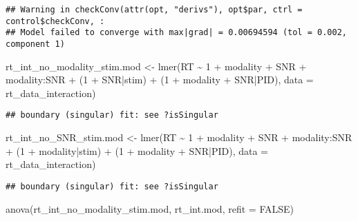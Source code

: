 \documentclass[
]{article}
\newenvironment{Shaded}{\begin{snugshade}}{\end{snugshade}}
\newcommand{\AttributeTok}[1]{\textcolor[rgb]{0.77,0.63,0.00}{#1}}
\newcommand{\ConstantTok}[1]{\textcolor[rgb]{0.00,0.00,0.00}{#1}}
\newcommand{\DecValTok}[1]{\textcolor[rgb]{0.00,0.00,0.81}{#1}}
\newcommand{\FunctionTok}[1]{\textcolor[rgb]{0.00,0.00,0.00}{#1}}
\newcommand{\NormalTok}[1]{#1}
\newcommand{\OtherTok}[1]{\textcolor[rgb]{0.56,0.35,0.01}{#1}}
\newcommand{\SpecialCharTok}[1]{\textcolor[rgb]{0.00,0.00,0.00}{#1}}
\begin{document}
\begin{verbatim}
## Warning in checkConv(attr(opt, "derivs"), opt$par, ctrl = control$checkConv, :
## Model failed to converge with max|grad| = 0.00694594 (tol = 0.002, component 1)
\end{verbatim}

\begin{Shaded}
\begin{Highlighting}[]
\NormalTok{rt\_int\_no\_modality\_stim.mod }\OtherTok{\textless{}{-}} \FunctionTok{lmer}\NormalTok{(RT }\SpecialCharTok{\textasciitilde{}} \DecValTok{1} \SpecialCharTok{+}\NormalTok{ modality }\SpecialCharTok{+}\NormalTok{ SNR }\SpecialCharTok{+}\NormalTok{ modality}\SpecialCharTok{:}\NormalTok{SNR }\SpecialCharTok{+}
\NormalTok{                     (}\DecValTok{1} \SpecialCharTok{+}\NormalTok{ SNR}\SpecialCharTok{|}\NormalTok{stim) }\SpecialCharTok{+}\NormalTok{ (}\DecValTok{1} \SpecialCharTok{+}\NormalTok{ modality }\SpecialCharTok{+}\NormalTok{ SNR}\SpecialCharTok{|}\NormalTok{PID), }
                   \AttributeTok{data =}\NormalTok{ rt\_data\_interaction)}
\end{Highlighting}
\end{Shaded}

\begin{verbatim}
## boundary (singular) fit: see ?isSingular
\end{verbatim}

\begin{Shaded}
\begin{Highlighting}[]
\NormalTok{rt\_int\_no\_SNR\_stim.mod }\OtherTok{\textless{}{-}} \FunctionTok{lmer}\NormalTok{(RT }\SpecialCharTok{\textasciitilde{}} \DecValTok{1} \SpecialCharTok{+}\NormalTok{ modality }\SpecialCharTok{+}\NormalTok{ SNR }\SpecialCharTok{+}\NormalTok{ modality}\SpecialCharTok{:}\NormalTok{SNR }\SpecialCharTok{+}
\NormalTok{                     (}\DecValTok{1} \SpecialCharTok{+}\NormalTok{ modality}\SpecialCharTok{|}\NormalTok{stim) }\SpecialCharTok{+}\NormalTok{ (}\DecValTok{1} \SpecialCharTok{+}\NormalTok{ modality }\SpecialCharTok{+}\NormalTok{ SNR}\SpecialCharTok{|}\NormalTok{PID), }
                   \AttributeTok{data =}\NormalTok{ rt\_data\_interaction)}
\end{Highlighting}
\end{Shaded}

\begin{verbatim}
## boundary (singular) fit: see ?isSingular
\end{verbatim}

\begin{Shaded}
\begin{Highlighting}[]
\FunctionTok{anova}\NormalTok{(rt\_int\_no\_modality\_stim.mod, rt\_int.mod, }\AttributeTok{refit =} \ConstantTok{FALSE}\NormalTok{)}
\end{Highlighting}
\end{Shaded}
\end{document}
